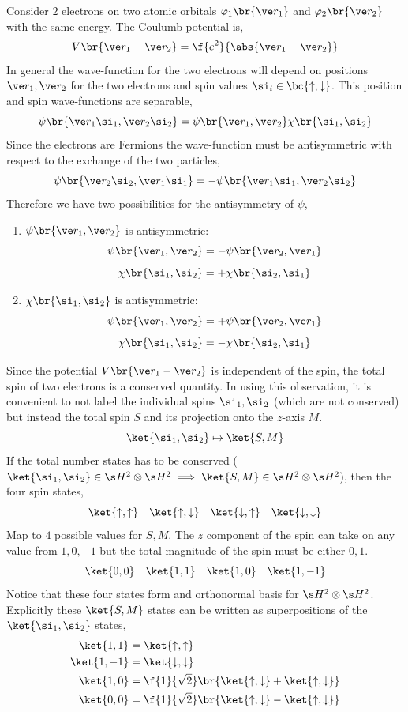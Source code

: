\documentclass{article}
\newcommand{\uu}{\uparrow}
\newcommand{\vp}{\varphi}
\newcommand{\dd}{\downarrow}
\begin{document}
Consider $2$ electrons on two atomic orbitals $\vp_1\br{\ve r_1}$ and $\vp_2\br{\ve r_2}$ with the same energy. The Coulumb potential is,
\[ V\br{\ve r_1 - \ve r_2} = \f{e^2}{\abs{\ve r_1 - \ve r_2}} \]
In general the wave-function for the two electrons will depend on positions $\ve r_1, \ve r_2$ for the two electrons and spin values $\si_i \in \bc{\uu, \dd}$. This position and spin wave-functions are separable,
\[ \psi \br{\ve r_1 \si_1, \ve r_2 \si_2} = \psi\br{\ve r_1, \ve r_2} \chi \br{\si_1, \si_2} \]
Since the electrons are Fermions the wave-function must be antisymmetric with respect to the exchange of the two particles,
\[ \psi\br{\ve r_2 \si_2, \ve r_1 \si_1} = - \psi\br{\ve r_1 \si_1, \ve r_2\si_2} \]
Therefore we have two possibilities for the antisymmetry of $\psi$,
\begin{enumerate}
    \item $\psi\br{\ve r_1, \ve r_2}$ is antisymmetric:
    \[ \psi\br{\ve r_1, \ve r_2} = -\psi\br{\ve r_2, \ve r_1} \]
    \[ \chi\br{\si_1, \si_2} = +\chi\br{\si_2, \si_1} \]
    \item $\chi\br{\si_1, \si_2}$ is antisymmetric:
    \[ \psi\br{\ve r_1, \ve r_2} = +\psi\br{\ve r_2, \ve r_1} \]
    \[ \chi\br{\si_1, \si_2} = -\chi\br{\si_2, \si_1} \]
\end{enumerate}
Since the potential $V \br{\ve r_1 - \ve r_2}$ is independent of the spin, the total spin of two electrons is a conserved quantity. In using this observation, it is convenient to not label the individual spins $\si_1, \si_2$ (which are not conserved) but instead the total spin $S$ and its projection onto the $z$-axis $M$.
\[ \ket{\si_1, \si_2} \mapsto \ket{S, M} \]
If the total number states has to be conserved ($\ket{\si_1, \si_2} \in \s H^{2} \otimes \s H^{2} \implies \ket{S, M} \in \s H^{2} \otimes \s H^{2}$), then the four spin states,
\[ \ket{\uu, \uu} \quad\ket{\uu, \dd} \quad\ket{\dd, \uu} \quad\ket{\dd, \dd}  \]
Map to $4$ possible values for $S, M$. The $z$ component of the spin can take on any value from $1, 0, -1$ but the total magnitude of the spin must be either $0,1$.
\[ \ket{0, 0} \quad\ket{1, 1} \quad\ket{1, 0} \quad\ket{1, -1}  \]
Notice that these four states form and orthonormal basis for $\s H^2 \otimes \s H^{2}$. Explicitly these $\ket{S, M}$ states can be written as superpositions of the $\ket{\si_1, \si_2}$ states,
\begin{align*}
    \ket{1,1} & = \ket{\uu, \uu} \\
    \ket{1, -1} &= \ket{\dd, \dd} \\
    \ket{1,0} &= \f{1}{\sqrt{2}}\br{\ket{\uu, \dd} + \ket{\uu, \dd}} \\
    \ket{0,0} &= \f{1}{\sqrt{2}}\br{\ket{\uu, \dd} - \ket{\uu, \dd}}
\end{align*}
\end{document}
